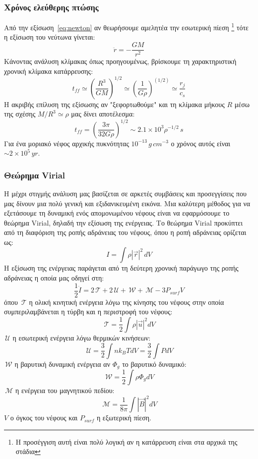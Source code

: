 \documentclass[a4paper,12pt]{memoir}
\newcommand{\TT}{\,\mathcal{T}}
\newcommand{\UU}{\,\mathcal{U}}
\newcommand{\WW}{\,\mathcal{W}}
\newcommand{\MM}{\,\mathcal{M}}
\begin{document}
\subsubsection{Χρόνος ελεύθερης πτώσης}
\label{par:freefall}
Από την εξίσωση~\ref{eq:newton} αν θεωρήσουμε αμελητέα την εσωτερική πίεση \footnote{H προσέγγιση αυτή είναι πολύ λογική αν η κατάρρευση είναι στα αρχικά της στάδια} τότε η εξίσωση του νεύτωνα γίνεται:
\begin{equation}
\ddot{r}=-\frac{GM}{r^2}
\end{equation}
Κάνοντας ανάλυση κλίμακας όπως προηγουμένως, βρίσκουμε τη χαρακτηριστική χρονική κλίμακα κατάρρευσης:
\begin{equation}
t_{ff}\simeq \left(\frac{R^3}{GM}\right)^{1/2} \simeq \left( \frac{1}{G \rho}\right) ^(1/2) \simeq \frac{r_j}{c_s} 
\end{equation}
Η ακριβής επίλυση της εξίσωσης αν "ξεφορτωθούμε" και τη κλίμακα μήκους $R$ μέσω της σχέσης $M/R^3 \simeq \rho$ μας δίνει αποτέλεσμα:
\begin{equation}
t_{ff}=\left( \frac{3 \pi}{32 G \rho}\right) ^{1/2} \sim 2.1\times 10^3 \rho ^{-1/2} \, s
\end{equation}
Για ένα μοριακό νέφος αρχικής πυκνότητας $10^{-13}\, g\,cm^{-3}$ ο χρόνος αυτός είναι $\sim 2\times 10^5 \, yr$. 

\subsubsection{Θεώρημα Virial}
Η μέχρι στιγμής ανάλυση μας βασίζεται σε αρκετές συμβάσεις και προσεγγίσεις που μας δίνουν μια πολύ γενική και εξιδανικευμένη εικόνα.
Μια καλύτερη μέθοδος για να εξετάσουμε τη δυναμική ενός απομονωμένου νέφους είναι να εφαρμόσουμε το θεώρημα Virial, δηλαδή την εξίσωση της ενέργειας.
Το θεώρημα Virial προκύπτει από τη διαφόριση της ροπής αδράνειας του νέφους, όπου η ροπή αδράνειας ορίζεται ως: 
\begin{equation}
I=\int \rho |\vec{r}|^2 \, dV
\end{equation}
Η εξίσωση της ενέργειας παράγεται από τη δεύτερη χρονική παράγωγο της ροπής αδράνειας η οποία μας οδηγεί στη:
\begin{equation}
\frac{1}{2}\ddot{I}=2\TT+2\UU +\WW+\MM -3P_{surf}V
\end{equation}
όπου $\TT$ η ολική κινητική ενέργεια λόγω της κίνησης του νέφους στην οποία συμπεριλαμβάνεται η τύρβη και η περιστροφή του νέφους:
\begin{equation}
\TT = \frac{1}{2} \int \rho |\vec{u}|^2 dV
\end{equation}
$\UU$ η εσωτερική ενέργεια λόγω θερμικών κινήσεων:
\begin{equation}
\UU=\frac{3}{2} \int n k_B T dV=\frac{3}{2} \int P dV
\end{equation}
$\WW$ η βαρυτική δυναμική ενέργεια αν $\Phi _g$ το βαρυτικό δυναμικό:
\begin{equation}
\WW=\frac{1}{2} \int \rho \Phi _g dV
\end{equation}
$\MM$ η ενέργεια του μαγνητικού πεδίου:
\begin{equation}
\MM=\frac{1}{8\pi} \int |\vec{B}|^2 dV
\end{equation}
$V$ ο όγκος του νέφους και $P_{surf}$ η εξωτερική πίεση. 
\end{document}
